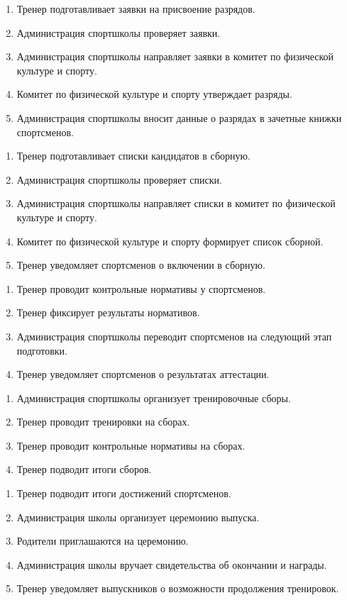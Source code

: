 \documentclass[12pt,a4paper,final]{article} %
\begin{document}
\begin{enumerate}[nosep, label=1.5.\arabic*]  
	\item Тренер подготавливает заявки на присвоение разрядов.
	\item Администрация спортшколы проверяет заявки.
	\item Администрация спортшколы направляет заявки в комитет по физической культуре и спорту.
	\item Комитет по физической культуре и спорту утверждает разряды.
	\item Администрация спортшколы вносит данные о разрядах в зачетные книжки спортсменов.
\end{enumerate}
\begin{enumerate}[nosep, label=1.6.\arabic*]  
	\item Тренер подготавливает списки кандидатов в сборную.
	\item Администрация спортшколы проверяет списки.
	\item Администрация спортшколы направляет списки в комитет по физической культуре и спорту.
	\item Комитет по физической культуре и спорту формирует список сборной.
	\item Тренер уведомляет спортсменов о включении в сборную.
\end{enumerate}
\begin{enumerate}[nosep, label=1.7.\arabic*]  
	\item Тренер проводит контрольные нормативы у спортсменов.
	\item Тренер фиксирует результаты нормативов.
	\item Администрация спортшколы переводит спортсменов на следующий этап подготовки.
	\item Тренер уведомляет спортсменов о результатах аттестации.
\end{enumerate}
\begin{enumerate}[nosep, label=1.8.\arabic*]  
	\item Администрация спортшколы организует тренировочные сборы.
	\item Тренер проводит тренировки на сборах.
	\item Тренер проводит контрольные нормативы на сборах.
	\item Тренер подводит итоги сборов.
\end{enumerate}
\begin{enumerate}[nosep, label=1.9.\arabic*]  
	\item Тренер подводит итоги достижений спортсменов.
	\item Администрация школы организует церемонию выпуска.
	\item Родители приглашаются на церемонию.
	\item Администрация школы вручает свидетельства об окончании и награды.
	\item Тренер уведомляет выпускников о возможности продолжения тренировок.
\end{enumerate}
\end{document}
